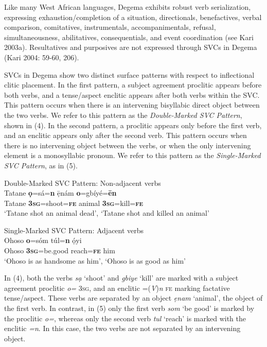\documentclass[output=paper]{langsci/langscibook}
\begin{document}
Like many West African languages, Degema exhibits robust verb serialization, expressing exhaustion/completion of a situation, directionals, benefactives, verbal comparison, comitatives, instrumentals, accompanimentals, refusal, simultaneousness, abilitatives, consequentials, and event coordination (see Kari 2003a). Resultatives and purposives are not expressed through SVCs in Degema (Kari 2004: 59-60, 206).

SVCs in Degema show two distinct surface patterns with respect to inflectional clitic placement. In the first pattern, a subject agreement proclitic appears before both verbs, and a tense/aspect enclitic appears after both verbs within the SVC. This pattern occurs when there is an intervening bisyllabic direct object between the two verbs. We refer to this pattern as the \textit{Double-Marked SVC Pattern}, shown in (4). In the second pattern, a proclitic appears only before the first verb, and an enclitic appears only after the second verb. This pattern occurs when there is no intervening object between the verbs, or when the only intervening element is a monosyllabic pronoun. We refer to this pattern as the \textit{Single-Marked SVC Pattern}, as in (5).

\ea
{Double-Marked SVC Pattern: Non-adjacent verbs}\\
\gll  Tatane  \textbf{ọ}=sá=\textbf{n}      \={e}̣nám  \textbf{o}=gbíyé=\textbf{\={e}n}\\
     Tatane  \textbf{3}\textbf{\textsc{sg}}=shoot=\textbf{\textsc{fe}}  animal  \textbf{3}\textbf{\textsc{sg}}=kill=\textbf{\textsc{fe}}\\
\glt ‘Tatane shot an animal dead’, ‘Tatane shot and killed an animal’
\z

\ea
{Single-Marked SVC Pattern: Adjacent verbs}\\
\gll  Ohoso   \textbf{o}=sóm       túl=\textbf{n}     ọ́yi\\
     Ohoso  \textbf{3}\textbf{\textsc{sg}}=be.good    reach=\textbf{\textsc{fe}}  him\\
\glt ‘Ohoso is as handsome as him’, ‘Ohoso is as good as him’
\z

In (4), both the verbs \textit{sạ} ‘shoot’ and \textit{gbiye }‘kill’ are marked with a subject agreement proclitic \textit{o=} \textsc{3sg}, and an enclitic =(\textit{V})\textit{n} \textsc{fe} marking factative tense/aspect. These verbs are separated by an object \textit{ẹnam} ‘animal’, the object of the first verb. In contrast, in (5) only the first verb \textit{som} ‘be good’ is marked by the proclitic \textit{o=}, whereas only the second verb \textit{tul} ‘reach’ is marked with the enclitic \textit{=n}. In this case, the two verbs are not separated by an intervening object. 
\end{document}
